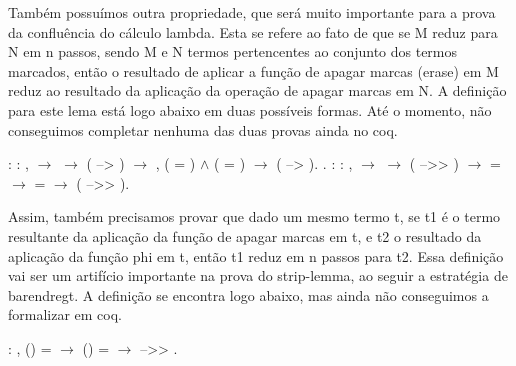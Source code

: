 Também possuímos outra propriedade, que será muito importante para a prova da confluência do cálculo lambda. Esta se refere ao 
fato de que se M reduz para N em n passos, sendo M e N termos pertencentes ao conjunto dos termos marcados, então o resultado de aplicar a função
de apagar marcas (erase) em M reduz ao resultado da aplicação da operação de apagar marcas em N. A definição para este lema está logo abaixo em 
duas possíveis formas. Até o momento, não conseguimos completar nenhuma das duas provas ainda no coq.\begin{coqdoccode}
\coqdocemptyline
\coqdocnoindent
{}  : \coqdockw{\ensuremath{\forall}}  : ,   \ensuremath{\rightarrow}   \ensuremath{\rightarrow} ( --> ) \ensuremath{\rightarrow} \coqdockw{\ensuremath{\forall}}  , (  = ) \ensuremath{\land} (  = ) \ensuremath{\rightarrow}  ( --> ).\coqdoceol
\coqdocnoindent
{}.\coqdoceol
\coqdocemptyline
\coqdocnoindent
{}  : \coqdockw{\ensuremath{\forall}}    : ,   \ensuremath{\rightarrow}   \ensuremath{\rightarrow} ( -->> ) \ensuremath{\rightarrow}   =  \ensuremath{\rightarrow}   =  \ensuremath{\rightarrow}  ( -->> ).\coqdoceol
\coqdocemptyline
\coqdocemptyline
\coqdocemptyline
\coqdocemptyline
\end{coqdoccode}
Assim, também precisamos provar que dado um mesmo termo t, se t1 é o termo resultante da aplicação da função de apagar marcas
em t, e t2 o resultado da aplicação da função phi em t, então t1 reduz em n passos para t2. Essa definição vai ser um artifício importante
na prova do strip-lemma, ao seguir a estratégia de barendregt. A definição se encontra logo abaixo, mas ainda não conseguimos a formalizar
em coq.\begin{coqdoccode}
\coqdocemptyline
\coqdocnoindent
{} : \coqdockw{\ensuremath{\forall}}   , () =  \ensuremath{\rightarrow} () =  \ensuremath{\rightarrow}  -->> .\coqdoceol
\coqdocemptyline
\coqdocemptyline
\coqdocemptyline
\coqdocemptyline
\coqdocemptyline
\end{coqdoccode}
